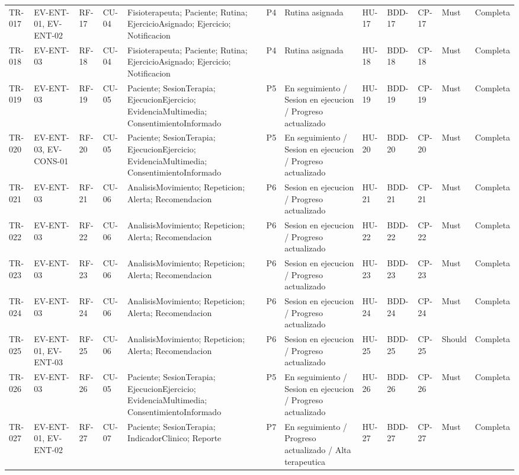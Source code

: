 \documentclass[12pt,a4paper]{article}
\begin{document}
\begin{landscape}
\begin{longtable}{p{0.9cm}p{2.5cm}p{1.7cm}p{1.8cm}p{3.6cm}p{1.6cm}p{3.0cm}p{1.6cm}p{1.8cm}p{1.8cm}p{1.4cm}p{1.5cm}}
TR-017 & EV-ENT-01, EV-ENT-02 & RF-17 & CU-04 & Fisioterapeuta; Paciente; Rutina; EjercicioAsignado; Ejercicio; Notificacion & P4 & Rutina asignada & HU-17 & BDD-17 & CP-17 & Must & Completa \\
TR-018 & EV-ENT-03 & RF-18 & CU-04 & Fisioterapeuta; Paciente; Rutina; EjercicioAsignado; Ejercicio; Notificacion & P4 & Rutina asignada & HU-18 & BDD-18 & CP-18 & Must & Completa \\
TR-019 & EV-ENT-03 & RF-19 & CU-05 & Paciente; SesionTerapia; EjecucionEjercicio; EvidenciaMultimedia; ConsentimientoInformado & P5 & En seguimiento / Sesion en ejecucion / Progreso actualizado & HU-19 & BDD-19 & CP-19 & Must & Completa \\
TR-020 & EV-ENT-03, EV-CONS-01 & RF-20 & CU-05 & Paciente; SesionTerapia; EjecucionEjercicio; EvidenciaMultimedia; ConsentimientoInformado & P5 & En seguimiento / Sesion en ejecucion / Progreso actualizado & HU-20 & BDD-20 & CP-20 & Must & Completa \\
TR-021 & EV-ENT-03 & RF-21 & CU-06 & AnalisisMovimiento; Repeticion; Alerta; Recomendacion & P6 & Sesion en ejecucion / Progreso actualizado & HU-21 & BDD-21 & CP-21 & Must & Completa \\
TR-022 & EV-ENT-03 & RF-22 & CU-06 & AnalisisMovimiento; Repeticion; Alerta; Recomendacion & P6 & Sesion en ejecucion / Progreso actualizado & HU-22 & BDD-22 & CP-22 & Must & Completa \\
TR-023 & EV-ENT-03 & RF-23 & CU-06 & AnalisisMovimiento; Repeticion; Alerta; Recomendacion & P6 & Sesion en ejecucion / Progreso actualizado & HU-23 & BDD-23 & CP-23 & Must & Completa \\
TR-024 & EV-ENT-03 & RF-24 & CU-06 & AnalisisMovimiento; Repeticion; Alerta; Recomendacion & P6 & Sesion en ejecucion / Progreso actualizado & HU-24 & BDD-24 & CP-24 & Must & Completa \\
TR-025 & EV-ENT-01, EV-ENT-03 & RF-25 & CU-06 & AnalisisMovimiento; Repeticion; Alerta; Recomendacion & P6 & Sesion en ejecucion / Progreso actualizado & HU-25 & BDD-25 & CP-25 & Should & Completa \\
TR-026 & EV-ENT-03 & RF-26 & CU-05 & Paciente; SesionTerapia; EjecucionEjercicio; EvidenciaMultimedia; ConsentimientoInformado & P5 & En seguimiento / Sesion en ejecucion / Progreso actualizado & HU-26 & BDD-26 & CP-26 & Must & Completa \\
TR-027 & EV-ENT-01, EV-ENT-02 & RF-27 & CU-07 & Paciente; SesionTerapia; IndicadorClinico; Reporte & P7 & En seguimiento / Progreso actualizado / Alta terapeutica & HU-27 & BDD-27 & CP-27 & Must & Completa \\

\end{longtable}
\end{landscape}
\end{document}
